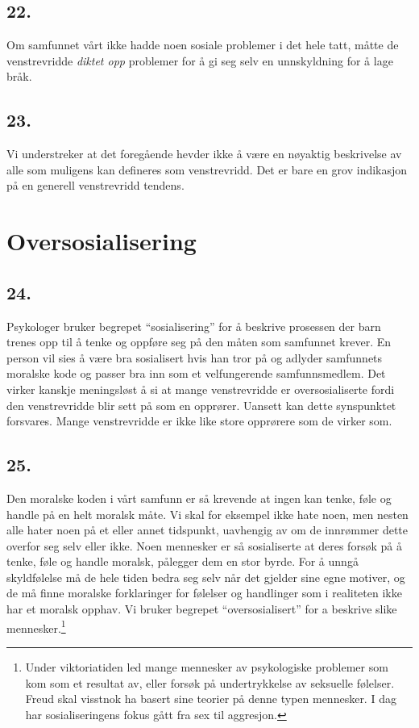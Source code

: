 \documentclass[oneside]{book}
\begin{document}
\section*{22.}
Om samfunnet vårt ikke hadde noen sosiale problemer i det hele tatt, måtte de
venstrevridde \emph{diktet opp} problemer for å gi seg selv en unnskyldning for
å lage bråk.

\section*{23.}
Vi understreker at det foregående hevder ikke å være en nøyaktig beskrivelse av
alle som muligens kan defineres som venstrevridd. Det er bare en grov
indikasjon på en generell venstrevridd tendens.

\chapter{Oversosialisering}
\section*{24.}
Psykologer bruker begrepet ``sosialisering'' for å beskrive prosessen der barn
trenes opp til å tenke og oppføre seg på den måten som samfunnet krever. En
person vil sies å være bra sosialisert hvis han tror på og adlyder samfunnets
moralske kode og passer bra inn som et velfungerende samfunnsmedlem. Det virker
kanskje meningsløst å si at mange venstrevridde er oversosialiserte fordi den
venstrevridde blir sett på som en opprører. Uansett kan dette synspunktet
forsvares. Mange venstrevridde er ikke like store opprørere som de virker som.

\section*{25.}
Den moralske koden i vårt samfunn er så krevende at ingen kan tenke, føle og
handle på en helt moralsk måte. Vi skal for eksempel ikke hate noen, men nesten
alle hater noen på et eller annet tidspunkt, uavhengig av om de innrømmer dette
overfor seg selv eller ikke. Noen mennesker er så sosialiserte at deres forsøk
på å tenke, føle og handle moralsk, pålegger dem en stor byrde. For å unngå
skyldfølelse må de hele tiden bedra seg selv når det gjelder sine egne motiver,
og de må finne moralske forklaringer for følelser og handlinger som i
realiteten ikke har et moralsk opphav. Vi bruker begrepet ``oversosialisert''
for a beskrive slike mennesker.\footnote{Under viktoriatiden led mange
mennesker av psykologiske problemer som kom som et resultat av, eller forsøk på
undertrykkelse av seksuelle følelser. Freud skal visstnok ha basert sine
teorier på denne typen mennesker. I dag har sosialiseringens fokus gått fra sex
til aggresjon.}
\end{document}
